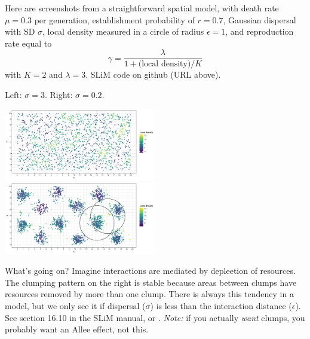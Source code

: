 \documentclass[fontscale=0.38,a0paper]{baposter}
\begin{document}
\begin{poster}
{    Here are screenshots from a straightforward spatial model, with
    death rate $\mu=0.3$ per generation, establishment probability of $r=0.7$,
    Gaussian dispersal with SD $\sigma$, 
    local density measured in a circle of radius $\epsilon=1$,
    and reproduction rate equal to 
        $$ \gamma = \frac{\lambda}{1 + \text{(local density)}/K} $$
    with $K=2$ and $\lambda=3$.
SLiM code on github (URL above).

Left: $\sigma = 3$. Right: $\sigma=0.2$.

    \includegraphics[width=0.5\textwidth]{figs/gilia_high_sigma}
    \includegraphics[width=0.5\textwidth]{figs/gilia_low_sigma}

What's going on?
Imagine interactions are mediated by depleetion of resources.
The clumping pattern on the right is stable because areas between clumps
have resources removed by more than one clump.
There is always this tendency in a model,
but we only see it if
dispersal ($\sigma$) is less than the interaction distance ($\epsilon$).
See section 16.10 in the SLiM manual,
or
\citet{sasaki1997clumped}.
\emph{Note:} if you actually \emph{want} clumps,
you probably want an Allee effect,
not this.


}


\end{poster}
\end{document}
